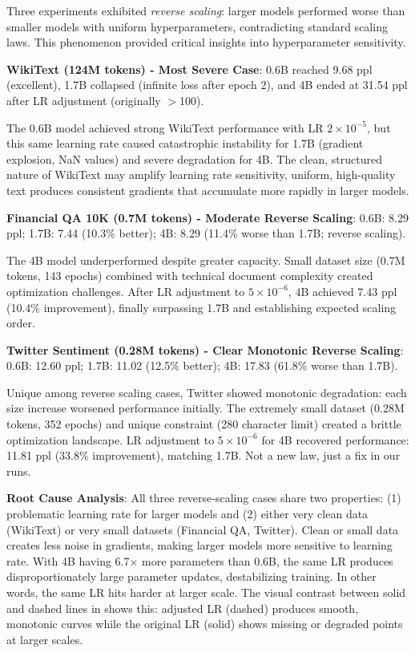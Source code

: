Three experiments exhibited \textit{reverse scaling}: larger models performed worse than smaller models with uniform hyperparameters, contradicting standard scaling laws. This phenomenon provided critical insights into hyperparameter sensitivity.

\textbf{WikiText (124M tokens) - Most Severe Case}: 0.6B reached 9.68 ppl (excellent), 1.7B collapsed (infinite loss after epoch 2), and 4B ended at 31.54 ppl after LR adjustment (originally $>$100).

The 0.6B model achieved strong WikiText performance with LR $2 \times 10^{-5}$, but this same learning rate caused catastrophic instability for 1.7B (gradient explosion, NaN values) and severe degradation for 4B. The clean, structured nature of WikiText may amplify learning rate sensitivity, uniform, high-quality text produces consistent gradients that accumulate more rapidly in larger models.

\textbf{Financial QA 10K (0.7M tokens) - Moderate Reverse Scaling}: 0.6B: 8.29 ppl; 1.7B: 7.44 (10.3\% better); 4B: 8.29 (11.4\% worse than 1.7B; reverse scaling).

The 4B model underperformed despite greater capacity. Small dataset size (0.7M tokens, 143 epochs) combined with technical document complexity created optimization challenges. After LR adjustment to $5 \times 10^{-6}$, 4B achieved 7.43 ppl (10.4\% improvement), finally surpassing 1.7B and establishing expected scaling order.

\textbf{Twitter Sentiment (0.28M tokens) - Clear Monotonic Reverse Scaling}: 0.6B: 12.60 ppl; 1.7B: 11.02 (12.5\% better); 4B: 17.83 (61.8\% worse than 1.7B).

Unique among reverse scaling cases, Twitter showed monotonic degradation: each size increase worsened performance initially. The extremely small dataset (0.28M tokens, 352 epochs) and unique constraint (280 character limit) created a brittle optimization landscape. LR adjustment to $5 \times 10^{-6}$ for 4B recovered performance: 11.81 ppl (33.8\% improvement), matching 1.7B. Not a new law, just a fix in our runs.

\textbf{Root Cause Analysis}: All three reverse‑scaling cases share two properties: (1) problematic learning rate for larger models and (2) either very clean data (WikiText) or very small datasets (Financial QA, Twitter). Clean or small data creates less noise in gradients, making larger models more sensitive to learning rate. With 4B having 6.7$\times$ more parameters than 0.6B, the same LR produces disproportionately large parameter updates, destabilizing training. In other words, the same LR hits harder at larger scale. The visual contrast between solid and dashed lines in  shows this: adjusted LR (dashed) produces smooth, monotonic curves while the original LR (solid) shows missing or degraded points at larger scales.


